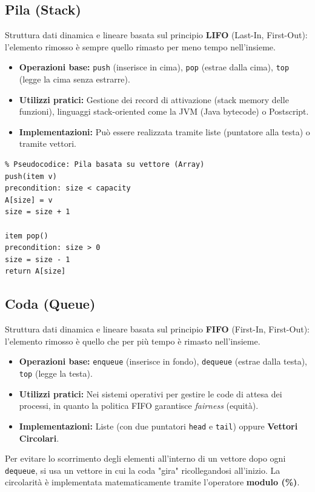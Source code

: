 \documentclass[12pt, a4paper]{article}
\begin{document}
\subsection{Pila (Stack)}
Struttura dati dinamica e lineare basata sul principio \textbf{LIFO} (Last-In, First-Out): l'elemento rimosso è sempre quello rimasto per meno tempo nell'insieme.
\begin{itemize}
\item \textbf{Operazioni base:} \texttt{push} (inserisce in cima), \texttt{pop} (estrae dalla cima), \texttt{top} (legge la cima senza estrarre).
\item \textbf{Utilizzi pratici:} Gestione dei record di attivazione (stack memory delle funzioni), linguaggi stack-oriented come la JVM (Java bytecode) o Postscript.
\item \textbf{Implementazioni:} Può essere realizzata tramite liste (puntatore alla testa) o tramite vettori.
\end{itemize}

\begin{verbatim}
% Pseudocodice: Pila basata su vettore (Array)
push(item v)
precondition: size < capacity
A[size] = v
size = size + 1

item pop()
precondition: size > 0
size = size - 1
return A[size]
\end{verbatim}

\subsection{Coda (Queue)}
Struttura dati dinamica e lineare basata sul principio \textbf{FIFO} (First-In, First-Out): l'elemento rimosso è quello che per più tempo è rimasto nell'insieme.
\begin{itemize}
\item \textbf{Operazioni base:} \texttt{enqueue} (inserisce in fondo), \texttt{dequeue} (estrae dalla testa), \texttt{top} (legge la testa).
\item \textbf{Utilizzi pratici:} Nei sistemi operativi per gestire le code di attesa dei processi, in quanto la politica FIFO garantisce \textit{fairness} (equità).
\item \textbf{Implementazioni:} Liste (con due puntatori \texttt{head} e \texttt{tail}) oppure \textbf{Vettori Circolari}.
\end{itemize}

\begin{tcolorbox}[colback=lightergray!10, colframe=tocsec, title=\textbf{La Coda basata su Vettore Circolare}]
Per evitare lo scorrimento degli elementi all'interno di un vettore dopo ogni \texttt{dequeue}, si usa un vettore in cui la coda "gira" ricollegandosi all'inizio.
La circolarità è implementata matematicamente tramite l'operatore \textbf{modulo (\%)}.
\end{tcolorbox}
\end{document}
